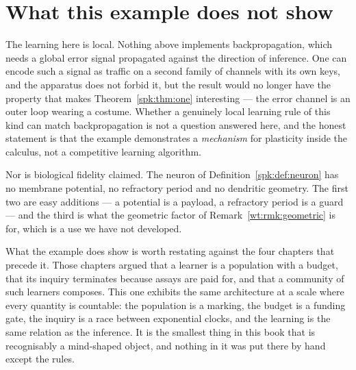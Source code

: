 \section{What this example does not show}

The learning here is local. Nothing above implements backpropagation, which needs a
global error signal propagated against the direction of inference. One can encode such a
signal as traffic on a second family of channels with its own keys, and the apparatus does
not forbid it, but the result would no longer have the property that makes
Theorem~\ref{spk:thm:one} interesting --- the error channel is an outer loop wearing a
costume. Whether a genuinely local learning rule of this kind can match backpropagation is
not a question answered here, and the honest statement is that the example demonstrates a
\emph{mechanism} for plasticity inside the calculus, not a competitive learning algorithm.

Nor is biological fidelity claimed. The neuron of Definition~\ref{spk:def:neuron} has no
membrane potential, no refractory period and no dendritic geometry. The first two are easy
additions --- a potential is a payload, a refractory period is a guard --- and the third is
what the geometric factor of Remark~\ref{wt:rmk:geometric} is for, which is a use we have
not developed.

What the example does show is worth restating against the four chapters that precede it.
Those chapters argued that a learner is a population with a budget, that its inquiry
terminates because assays are paid for, and that a community of such learners composes.
This one exhibits the same architecture at a scale where every quantity is countable: the
population is a marking, the budget is a funding gate, the inquiry is a race between
exponential clocks, and the learning is the same relation as the inference. It is the
smallest thing in this book that is recognisably a mind-shaped object, and nothing in it
was put there by hand except the rules.


